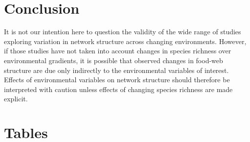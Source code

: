 \documentclass[12pt]{article}
\begin{document}
\section*{Conclusion}

It is not our intention here to question the validity of the wide range of
studies exploring variation in network structure across changing environments.
However, if those studies have not taken into account changes in species
richness over environmental gradients, it is possible that observed changes in
food-web structure are due only indirectly to the environmental variables of
interest. Effects of environmental variables on network structure should
therefore be interpreted with caution unless effects of changing species
richness are made explicit.


\newpage

\newpage

\section*{Tables}
\end{document}
